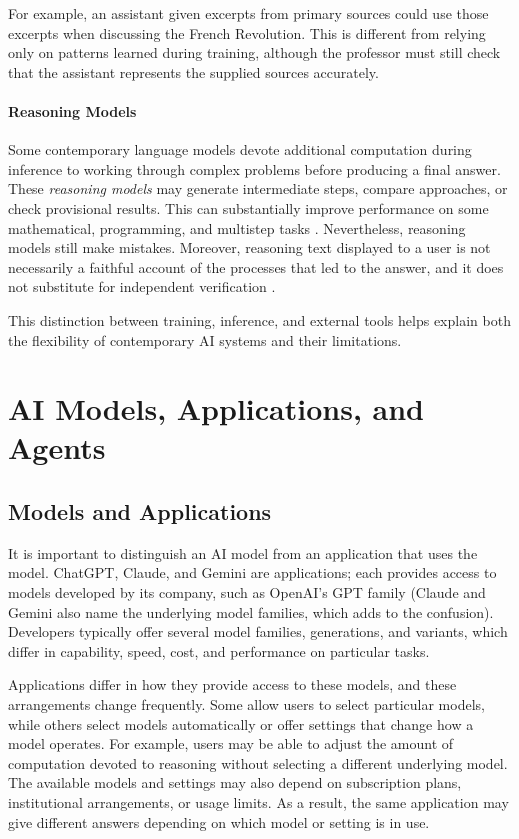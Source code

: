 \documentclass[11pt]{article}
\begin{document}
For example, an assistant given excerpts from primary
sources could use those excerpts when discussing the
French Revolution. This is different from relying only
on patterns learned during training, although the
professor must still check that the assistant represents
the supplied sources accurately.

\paragraph{Reasoning Models}
Some contemporary language models devote additional computation
during inference to working through complex problems before
producing a final answer. These \emph{reasoning models} may
generate intermediate steps, compare approaches, or check
provisional results. This can substantially improve performance
on some mathematical, programming, and multistep tasks
\citep{StanfordHAI2025Index}. Nevertheless, reasoning models
still make mistakes. Moreover, reasoning text displayed to a
user is not necessarily a faithful account of the processes
that led to the answer, and it does not substitute for
independent verification \citep{LewisLim2025CoT}.

This distinction between training, inference, and
external tools helps explain both the flexibility of
contemporary AI systems and their limitations.

\section{AI Models, Applications, and Agents}
\subsection{Models and Applications}
It is important to distinguish an AI model from an application that uses the model. ChatGPT, Claude, and Gemini are applications;
each provides access to models developed by its company, such as OpenAI's GPT family (Claude and Gemini also name the underlying model families, which adds to the confusion).
Developers typically offer several model families, generations, and variants, which differ in capability, speed, cost, and performance on particular tasks.

Applications differ in how they provide access to these models, and these arrangements change frequently. Some allow users to select particular models, while others select models automatically or offer settings that change how a model operates. For example, users may be able to adjust the amount of computation devoted to reasoning without selecting a different underlying model. The available models and settings may also depend on subscription plans, institutional arrangements, or usage limits. As a result, the same application may give different answers depending on which model or setting is in use.
\end{document}
